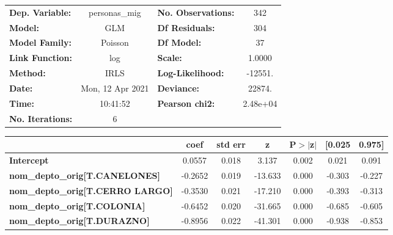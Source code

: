 \begin{center}
\begin{tabular}{lclc}
\toprule
\textbf{Dep. Variable:}                     &  personas\_mig   & \textbf{  No. Observations:  } &      342    \\
\textbf{Model:}                             &       GLM        & \textbf{  Df Residuals:      } &      304    \\
\textbf{Model Family:}                      &     Poisson      & \textbf{  Df Model:          } &       37    \\
\textbf{Link Function:}                     &       log        & \textbf{  Scale:             } &    1.0000   \\
\textbf{Method:}                            &       IRLS       & \textbf{  Log-Likelihood:    } &   -12551.   \\
\textbf{Date:}                              & Mon, 12 Apr 2021 & \textbf{  Deviance:          } &    22874.   \\
\textbf{Time:}                              &     10:41:52     & \textbf{  Pearson chi2:      } &  2.48e+04   \\
\textbf{No. Iterations:}                    &        6         & \textbf{                     } &             \\
\bottomrule
\end{tabular}
\begin{tabular}{lcccccc}
                                            & \textbf{coef} & \textbf{std err} & \textbf{z} & \textbf{P$> |$z$|$} & \textbf{[0.025} & \textbf{0.975]}  \\
\midrule
\textbf{Intercept}                          &       0.0557  &        0.018     &     3.137  &         0.002        &        0.021    &        0.091     \\
\textbf{nom\_depto\_orig[T.CANELONES]}      &      -0.2652  &        0.019     &   -13.633  &         0.000        &       -0.303    &       -0.227     \\
\textbf{nom\_depto\_orig[T.CERRO LARGO]}    &      -0.3530  &        0.021     &   -17.210  &         0.000        &       -0.393    &       -0.313     \\
\textbf{nom\_depto\_orig[T.COLONIA]}        &      -0.6452  &        0.020     &   -31.665  &         0.000        &       -0.685    &       -0.605     \\
\textbf{nom\_depto\_orig[T.DURAZNO]}        &      -0.8956  &        0.022     &   -41.301  &         0.000        &       -0.938    &       -0.853     \\

\end{tabular}
\end{center}
